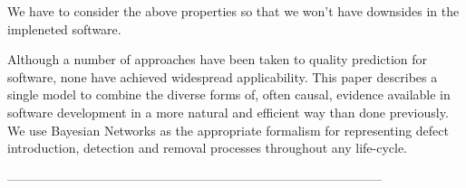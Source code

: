 We have to consider the above properties so that we won't have downsides in the impleneted software.

Although a number of approaches have been taken to quality prediction for software, none have
achieved widespread applicability. This paper describes a single model to combine the diverse forms
of, often causal, evidence available in software development in a more natural and efficient way than
done previously. We use Bayesian Networks as the appropriate formalism for representing defect
introduction, detection and removal processes throughout any life-cycle. \cite{neil2005improved}

-----------------------------------------------------------------------------------------


